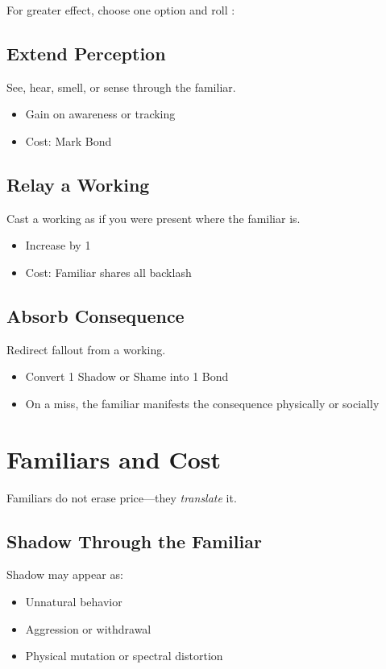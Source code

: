 For greater effect, choose one option and roll :

\subsection{Extend Perception}
See, hear, smell, or sense through the familiar.
\begin{itemize}
  \item Gain  on awareness or tracking
  \item Cost: Mark Bond
\end{itemize}

\subsection{Relay a Working}
Cast a working as if you were present where the familiar is.
\begin{itemize}
  \item Increase \DV{} by 1
  \item Cost: Familiar shares all backlash
\end{itemize}

\subsection{Absorb Consequence}
Redirect fallout from a working.
\begin{itemize}
  \item Convert 1 Shadow or Shame into 1 Bond
  \item On a miss, the familiar manifests the consequence physically or socially
\end{itemize}

\section{Familiars and Cost}
Familiars do not erase price---they \emph{translate} it.

\subsection{Shadow Through the Familiar}
Shadow may appear as:
\begin{itemize}
  \item Unnatural behavior
  \item Aggression or withdrawal
  \item Physical mutation or spectral distortion
\end{itemize}

